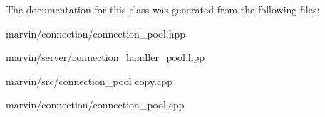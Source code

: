 The documentation for this class was generated from the following files\+:\begin{DoxyCompactItemize}
\item 
marvin/connection/connection\+\_\+pool.\+hpp\item 
marvin/server/connection\+\_\+handler\+\_\+pool.\+hpp\item 
marvin/src/connection\+\_\+pool copy.\+cpp\item 
marvin/connection/connection\+\_\+pool.\+cpp\end{DoxyCompactItemize}
